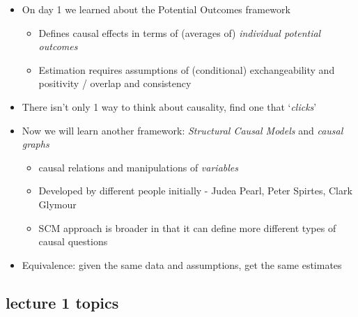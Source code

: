\documentclass[
  letterpaper,
  DIV=11,
  numbers=noendperiod]{scrartcl}
\providecommand{\tightlist}{%
  \setlength{\itemsep}{0pt}\setlength{\parskip}{0pt}}\usepackage{longtable,booktabs,array}
\begin{document}
\begin{itemize}
\tightlist
\item
  On day 1 we learned about the Potential Outcomes framework

  \begin{itemize}
  \tightlist
  \item
    Defines causal effects in terms of (averages of) \emph{individual
    potential outcomes}
  \item
    Estimation requires assumptions of (conditional) exchangeability and
    positivity / overlap and consistency
  \end{itemize}
\item
  There isn't only 1 way to think about causality, find one that
  `\emph{clicks}'
\item
  Now we will learn another framework: \emph{Structural Causal Models}
  and \emph{causal graphs}

  \begin{itemize}
  \tightlist
  \item
    causal relations and manipulations of \emph{variables}
  \item
    Developed by different people initially - Judea Pearl, Peter
    Spirtes, Clark Glymour
  \item
    SCM approach is broader in that it can define more different types
    of causal questions
  \end{itemize}
\item
  Equivalence: given the same data and assumptions, get the same
  estimates
\end{itemize}

\subsection{lecture 1 topics}\label{lecture-1-topics}
\end{document}
